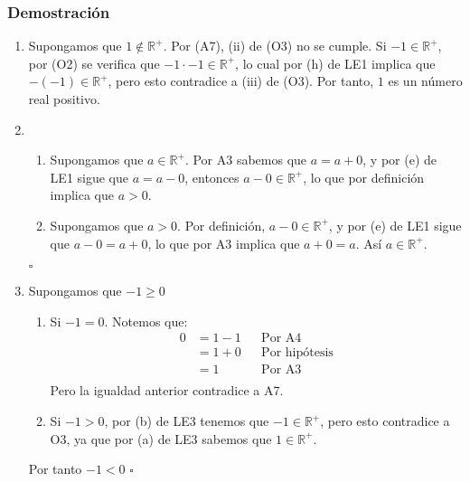 \documentclass[11pt]{article}
\begin{document}
\subsubsection*{Demostración}

\begin{enumerate}[label=\alph*),font=\bfseries]


    \item Supongamos que $1 \notin \mathbb{R}^+$. Por (A7), (ii) de (O3) no se cumple. Si $-1 \in \mathbb{R}^+$, por (O2) se verifica que $-1 \cdot -1 \in \mathbb{R}^+$, lo cual por (h) de LE1 implica que $-(-1) \in \mathbb{R}^+$, pero esto contradice a (iii) de (O3). Por tanto, $1$ es un número real positivo.


    \item \begin{enumerate}[label=\roman*),font=\bfseries]
        \item Supongamos que $a \in \mathbb{R}^+$. Por A3 sabemos que $a=a+0$, y por (e) de LE1 sigue que $a=a-0$, entonces $a-0 \in \mathbb{R}^+$, lo que por definición implica que $a>0$.
        \item Supongamos que $a>0$. Por definición, $a-0 \in \mathbb{R}^+$, y por (e) de LE1 sigue que $a-0=a+0$, lo que por A3 implica que $a+0=a$. Así $a \in \mathbb{R}^+$.
        \end{enumerate}
    \mbox{}\hfill $\square$


    \item Supongamos que $-1 \geq 0$
    \begin{enumerate}[label=\roman*),font=\bfseries]
        \item Si $-1=0$. Notemos que:
        \begin{align*}
        0 &= 1 - 1 && \text{Por A4}\\
        &= 1 + 0 && \text{Por hipótesis}\\
        &= 1 && \text{Por A3}\\
        \end{align*}
        Pero la igualdad anterior contradice a A7.
        \item Si $-1 > 0$, por (b) de LE3 tenemos que $-1 \in \mathbb{R}^+$, pero esto contradice a O3, ya que por (a) de LE3 sabemos que $1 \in \mathbb{R}^+$.
    \end{enumerate}
    Por tanto $-1<0$
    \mbox{}\hfill $\square$


\end{enumerate}
\end{document}
